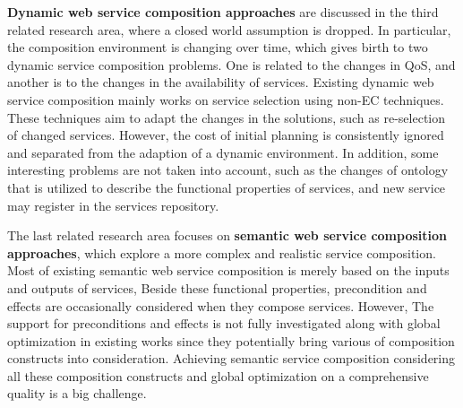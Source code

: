\textbf{Dynamic web service composition approaches} are discussed in the third related research area, where a closed world assumption is dropped. In particular, the composition environment is changing over time, which gives birth to two dynamic service composition problems. One is related to the changes in QoS, and another is to the changes in the availability of services. Existing dynamic web service composition mainly works on service selection using non-EC techniques. These techniques aim to adapt the changes in the solutions, such as re-selection of changed services. However, the cost of initial planning is consistently ignored and separated from the adaption of a dynamic environment. In addition, some interesting problems are not taken into account, such as the changes of ontology that is utilized to describe the functional properties of services,  and new service may register in the services repository.

The last related research area focuses on \textbf{semantic web service composition approaches}, which explore a more complex and realistic service composition. Most of existing semantic web service composition is merely based on the inputs and outputs of services, Beside these functional properties,  precondition and effects are occasionally considered when they compose services. However,   The support for preconditions and effects is not fully investigated along with global optimization in existing works since they potentially bring various of composition constructs into consideration. Achieving semantic service composition considering all these composition constructs and global optimization on a comprehensive quality is a big challenge.

